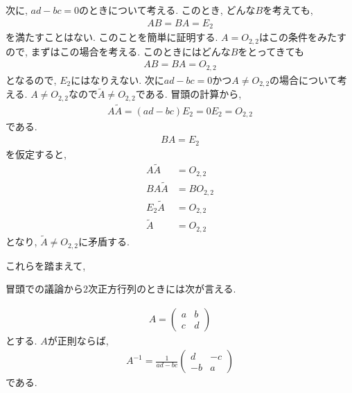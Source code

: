次に, $ad-bc= 0$のときについて考える.
このとき, どんな$B$を考えても,
\begin{align*}
  AB=BA=E_2
\end{align*}
を満たすことはない.
このことを簡単に証明する.
$A=O_{2,2}$はこの条件をみたすので,
まずはこの場合を考える.
このときにはどんな$B$をとってきても
\begin{align*}
  AB=BA=O_{2,2}
\end{align*}
となるので, $E_2$にはなりえない.
次に$ad-bc= 0$かつ$A\neq O_{2,2}$の場合について考える.
$A\neq O_{2,2}$なので$\tilde A \neq O_{2,2}$である.
冒頭の計算から,
\begin{align*}
  A\tilde A=(ad-bc)E_2=0E_2=O_{2,2}
\end{align*}
である.
\begin{align*}
  BA=E_2
\end{align*}
を仮定すると,
\begin{align*}
  A\tilde A&=O_{2,2}\\
  BA\tilde A&=BO_{2,2}\\
  E_2\tilde A&=O_{2,2}\\
  \tilde A&=O_{2,2}
\end{align*}
となり, $\tilde A\neq O_{2,2}$に矛盾する.


これらを踏まえて,

冒頭での議論から$2$次正方行列のときには次が言える.
\begin{theorem}
  \begin{align*}
    A=
  \begin{pmatrix}
    a&b\\c&d
  \end{pmatrix}
  \end{align*}
  とする.  $A$が正則ならば,
  \begin{align*}
    A^{-1}=
    \frac{1}{ad-bc}
    \begin{pmatrix}
      d&-c\\-b&a
    \end{pmatrix}
  \end{align*}
  である.
\end{theorem}


